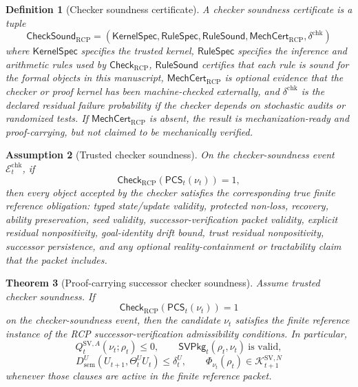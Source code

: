 \documentclass[11pt]{article}
\newtheorem{theorem}{Theorem}[section]
\newtheorem{definition}[theorem]{Definition}
\newtheorem{assumption}[theorem]{Assumption}
\newcommand{\Ecal}{\mathcal{E}}
\newcommand{\1}{\mathbf{1}}
\newcommand{\RCP}{\mathrm{RCP}}
\providecommand{\Kcal}{\mathcal{K}}
\providecommand{\sem}{\mathrm{sem}}
\begin{document}
\begin{definition}[Checker soundness certificate]
\label{def:batch13r_checker_soundness_certificate}
A checker soundness certificate is a tuple
\[
\mathsf{CheckSound}_{\RCP}
=(\mathsf{KernelSpec},\mathsf{RuleSpec},\mathsf{RuleSound},\mathsf{MechCert}_{\RCP},\delta^{\mathrm{chk}})
\]
where \(\mathsf{KernelSpec}\) specifies the trusted kernel, \(\mathsf{RuleSpec}\) specifies the inference and arithmetic rules used by \(\mathsf{Check}_{\RCP}\), \(\mathsf{RuleSound}\) certifies that each rule is sound for the formal objects in this manuscript, \(\mathsf{MechCert}_{\RCP}\) is optional evidence that the checker or proof kernel has been machine-checked externally, and \(\delta^{\mathrm{chk}}\) is the declared residual failure probability if the checker depends on stochastic audits or randomized tests.  If \(\mathsf{MechCert}_{\RCP}\) is absent, the result is mechanization-ready and proof-carrying, but not claimed to be mechanically verified.
\end{definition}

\begin{assumption}[Trusted checker soundness]
\label{ass:batch13r_trusted_checker_soundness}
On the checker-soundness event \(\Ecal^{\mathrm{chk}}_{t}\), if
\[
\mathsf{Check}_{\RCP}(\mathsf{PCS}_t(\nu_t))=1,
\]
then every object accepted by the checker satisfies the corresponding true finite reference obligation: typed state/update validity, protected non-loss, recovery, ability preservation, seed validity, successor-verification packet validity, explicit residual nonpositivity, goal-identity drift bound, trust residual nonpositivity, successor persistence, and any optional reality-containment or tractability claim that the packet includes.
\end{assumption}

\begin{theorem}[Proof-carrying successor checker soundness]
\label{thm:batch13r_pcs_checker_soundness}
Assume trusted checker soundness.  If
\[
\mathsf{Check}_{\RCP}(\mathsf{PCS}_t(\nu_t))=1
\]
on the checker-soundness event, then the candidate \(\nu_t\) satisfies the finite reference instance of the RCP successor-verification admissibility conditions.  In particular,
\[
Q_t^{\mathrm{SV},A}(\nu_t;\rho_t)\le0,
\qquad
\mathsf{SVPkg}_t(\rho_t,\nu_t)\ \text{is valid},
\]
\[
D_{\sem}^{U}(U_{t+1},\Theta_t^U U_t)\le\delta_t^U,
\qquad
\Phi_{\nu_t}(\rho_t)\in\Kcal_{t+1}^{\mathrm{SV},N}
\]
whenever those clauses are active in the finite reference packet.
\end{theorem}
\end{document}
